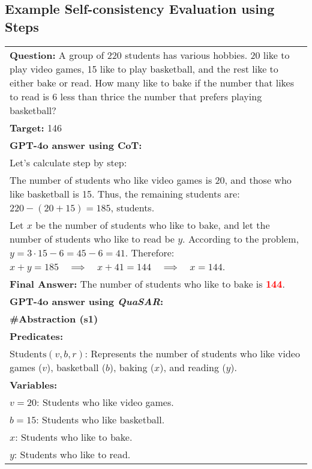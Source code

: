 \documentclass[11pt]{article}
\newcommand{\QuaSAR}{\emph{QuaSAR}\xspace}
\begin{document}
\begin{table*}[h!]
\section{Example Self-consistency Evaluation using Steps}
\label{app:Example_Self-consistency_Evaluation}
\centering
\small
\begin{tabular}{p{16cm}}
\textbf{Question:} A group of 220 students has various hobbies. 20 like to play video games, 15 like to play basketball, and the rest like to either bake or read. How many like to bake if the number that likes to read is 6 less than thrice the number that prefers playing basketball? \\
\textbf{Target:} 146  \\
\midrule
\textbf{GPT-4o answer using CoT:} \\
Let's calculate step by step: \\
The number of students who like video games is 20, and those who like basketball is 15. Thus, the remaining students are: $220 - (20 + 15) = 185$, students.\\
Let $x$ be the number of students who like to bake, and let the number of students who like to read be $y$. According to the problem, \( y = 3 \cdot 15 - 6 = 45 - 6 = 41. \) Therefore:
$
x + y = 185 \quad \implies \quad x + 41 = 144 \quad \implies \quad x = 144$.\\
\textbf{Final Answer:} The number of students who like to bake is \textcolor{red}{\textbf{144}}. \\
\midrule
\textbf{GPT-4o answer using \QuaSAR:}\\
\textbf{\#Abstraction (s1)}\\
\textbf{Predicates:}\\
 \hspace*{0.3cm}  \hspace{0.1cm} \( \text{Students}(v, b, r) \): Represents the number of students who like video games (\(v\)), basketball (\(b\)), baking (\(x\)), and reading (\(y\)). \\
\textbf{Variables:}\\
\hspace*{0.5cm} \(v=20\): Students who like video games.\\
\hspace*{0.5cm} \(b=15\): Students who like basketball.\\
\hspace*{0.5cm} \(x\): Students who like to bake.\\
\hspace*{0.5cm} \(y\): Students who like to read.\\


\end{tabular}
\end{table*}
\end{document}
